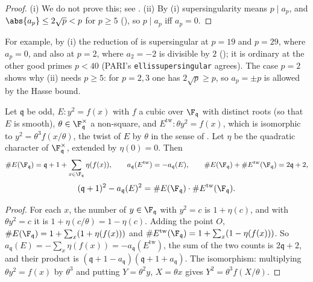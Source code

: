 \begin{proof}
(i) We do not prove this; see \cite[Section V.3]{SilvermanAEC}. (ii) By (i) supersingularity means $p\mid a_p$, and $\abs{a_p}\le2\sqrt p<p$ for $p\ge5$ (), so $p\mid a_p$ iff $a_p=0$.
\end{proof}

\noindent For example, by (i) the reduction of  is supersingular at $p=19$ and $p=29$, where $a_p=0$, and also at $p=2$, where $a_2=-2$ is divisible by $2$
(); it is ordinary at the other good primes $p<40$ (PARI's \texttt{ellissupersingular} agrees). The case $p=2$ shows why (ii) needs $p\ge5$: for
$p=2,3$ one has $2\sqrt p\ge p$, so $a_p=\pm p$ is allowed by the Hasse bound.

\begin{proposition}\label{prop:ellcurves:twistFq}
Let $\mathfrak q$ be odd, $E\colon y^2=f(x)$ with $f$ a cubic over $\F_{\mathfrak q}$ with distinct roots (so that $E$ is smooth), $\theta\in\F_{\mathfrak q}^\times$ a non-square, and $E^{\mathrm{tw}}\colon\theta y^2=f(x)$, which is isomorphic to
$y^2=\theta^3f(x/\theta)$, the twist of $E$ by $\theta$ in the sense of . Let $\eta$ be the quadratic character of $\F_{\mathfrak q}^\times$, extended by $\eta(0)=0$. Then
\[
\#E(\F_{\mathfrak q})=\mathfrak q+1+\sum_{x\in\F_{\mathfrak q}}\eta(f(x)),\qquad a_{\mathfrak q}(E^{\mathrm{tw}})=-a_{\mathfrak q}(E),\qquad\#E(\F_{\mathfrak q})+\#E^{\mathrm{tw}}(\F_{\mathfrak q})=2\mathfrak q+2,
\]
\[
(\mathfrak q+1)^2-a_{\mathfrak q}(E)^2=\#E(\F_{\mathfrak q})\cdot\#E^{\mathrm{tw}}(\F_{\mathfrak q}).
\]
\end{proposition}

\begin{proof}
For each $x$, the number of $y\in\F_{\mathfrak q}$ with $y^2=c$ is $1+\eta(c)$, and with $\theta y^2=c$ it is $1+\eta(c/\theta)=1-\eta(c)$. Adding the point $O$, $\#E(\F_{\mathfrak q})=1+\sum_x(1+\eta(f(x)))$ and
$\#E^{\mathrm{tw}}(\F_{\mathfrak q})=1+\sum_x(1-\eta(f(x)))$. So $a_{\mathfrak q}(E)=-\sum_x\eta(f(x))=-a_{\mathfrak q}(E^{\mathrm{tw}})$, the sum of the two counts is $2\mathfrak q+2$, and their product is
$(\mathfrak q+1-a_{\mathfrak q})(\mathfrak q+1+a_{\mathfrak q})$. The isomorphism: multiplying $\theta y^2=f(x)$ by $\theta^3$ and putting $Y=\theta^2y$, $X=\theta x$ gives $Y^2=\theta^3f(X/\theta)$.
\end{proof}

